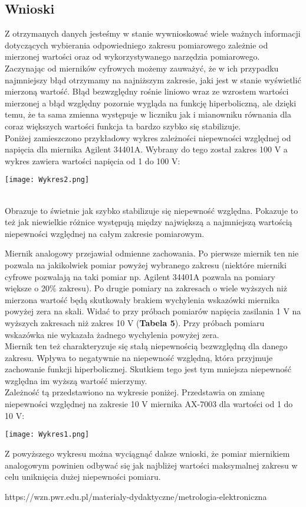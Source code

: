 \documentclass[11pt]{article}
\begin{document}
    \subsection*{Wnioski}
    \indent Z otrzymanych danych jesteśmy w stanie wywnioskować wiele ważnych informacji dotyczących wybierania odpowiedniego zakresu pomiarowego zależnie od mierzonej
    wartości oraz od wykorzystywanego narzędzia pomiarowego.\\
    \indent Zaczynając od mierników cyfrowych możemy zauważyć, że w ich przypadku najmniejszy błąd otrzymamy na najniższym zakresie, jaki jest w stanie wyświetlić mierzoną
    wartość. Błąd bezwzględny rośnie liniowo wraz ze wzrostem wartości mierzonej a błąd
    względny pozornie wygląda na funkcję hiperboliczną, ale dzięki temu, że ta sama zmienna występuje w liczniku jak i mianowniku równania dla coraz większych wartości
    funkcja ta bardzo szybko się stabilizuje.\\
    \noindent Poniżej zamieszczono przykładowy wykres zależności niepewności względnej od napięcia dla miernika Agilent 34401A. Wybrany do tego został zakres 100 V a wykres zawiera
    wartości napięcia od 1 do 100 V:\\
    \centerline{\texttt{[image: Wykres2.png]}}\\
    \indent Obrazuje to świetnie jak szybko stabilizuje się niepewność względna. Pokazuje to też
    jak niewielkie różnice występują między największą a najmniejszą wartością niepewności
    względnej na całym zakresie pomiarowym.

    \newpage
    \par{Miernik analogowy przejawiał odmienne zachowania. Po pierwsze miernik ten nie pozwala na jakikolwiek pomiar powyżej wybranego zakresu (niektóre mierniki cyfrowe pozwalają na taki pomiar np. Agilent 34401A pozwala na pomiary większe o 20\% zakresu).
    Po drugie pomiary na zakresach o wiele wyższych niż mierzona wartość będą skutkowały brakiem wychylenia wskazówki miernika powyżej zera na skali.
    Widać to przy próbach pomiarów napięcia zasilania 1 V na wyższych zakresach niż zakres 10 V (\textbf{Tabela 5}). Przy próbach pomiaru wskazówka nie wykazała żadnego wychylenia powyżej zera.}\\
    \indent Miernik ten też charakteryzuje się stałą niepewnością bezwzględną dla danego zakresu. Wpływa to negatywnie na niepewność względną, która przyjmuje zachowanie funkcji hiperbolicznej.
    Skutkiem tego jest tym mniejsza niepewność względna im wyższą wartość mierzymy.\\
    \indent Zależność tą przedstawiono na wykresie poniżej. Przedstawia on zmianę niepewności względnej na zakresie 10 V miernika AX-7003 dla wartości od 1 do 10 V:
    \\
    \centerline{\texttt{[image: Wykres1.png]}}
    \indent Z powyższego wykresu można wyciągnąć dalsze wnioski, że pomiar miernikiem analogowym powinien odbywać się jak najbliżej wartości maksymalnej zakresu w celu
    uniknięcia dużej niepewności pomiaru.\\

    \tiny{\begin{thebibliography}{9}
         https://wzn.pwr.edu.pl/materialy-dydaktyczne/metrologia-elektroniczna
    \end{thebibliography}}
\end{document}
